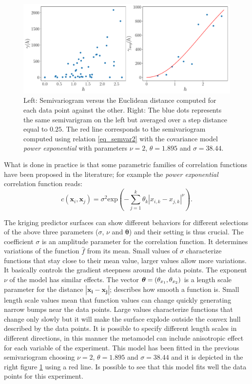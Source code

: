 \begin{figure}[ht]
	\centering
	\includegraphics[width=0.9\linewidth]{appendix_a/sem}
	\caption{Left: Semivariogram versus the Euclidean distance computed for each data point against the other.  Right: The blue dots represents the same semivarigram on the left but averaged over a step distance equal to $0.25$. The red line corresponds to the semivariogram computed using relation \eqref{eq_semvar2} with the covariance model \textit{power exponential} with parameters $\nu=2$, $\theta=1.895$ and $\sigma=38.44$.}
	\label{fig:semivariogram}
\end{figure}

What is done in practice is that some parametric families of correlation functions have been proposed in the literature; for example the \textit{power exponential} correlation function reads:
\begin{equation}
c(\mathbf{x}_{i} , \mathbf{x}_{j})  = \sigma^2 \textrm{exp}\left( -\sum_{j=1}^{k} \theta_k {|{x}_{i,k} - {x}_{j,k} |}^\nu \right).
\end{equation}

The kriging predictor surfaces can show different behaviors for different selections of the above three parameters ($\sigma$, $\nu$ and $\boldsymbol{\theta}$) and their setting is thus crucial.
The coefficient $\sigma$ is an amplitude parameter for the correlation function. It determines variations of the function $\hat{f}$ from its mean. Small values of $\sigma$ characterize functions that stay close to their mean value, larger values allow more variations. It basically controls the gradient steepness around the data points. The exponent $\nu$ of the model has similar effects.
The vector $\boldsymbol{\theta}=(\theta_{x_1}, \theta_{x_2})$ is a length scale parameter for the distance $|\mathbf{x_i} - \mathbf{x_j}|$; describes how smooth a function is. Small length scale values mean that function values can change quickly generating narrow bumps near the data points. Large values characterize functions that change only slowly but it will make the surface explode outside the convex hull described by the data points. It is possible to specify different length scales in different directions, in this manner the metamodel can include anisotropic effect for each variable of the experiment.
This model has been fitted in the previous semivariogram choosing $\nu=2$, $\theta=1.895$ and $\sigma=38.44$ and it is depicted in the right figure \ref{fig:semivariogram} using a red line. Is possible to see that this model fits well the data points for this experiment.

